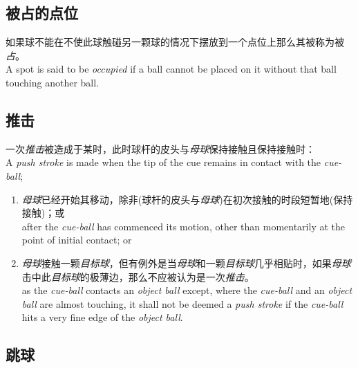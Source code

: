 \subsection{被占的点位}

\noindent 如果球不能在不使此球触碰另一颗球的情况下摆放到一个点位上那么其被称为被\emph{占}。\\
A spot is said to be \emph{occupied} if a ball cannot be placed on it without that ball touching another ball.

\subsection{推击}

\noindent 一次\emph{推击}被造成于某时，此时球杆的皮头与\emph{母球}保持接触且保持接触时：\\
A \emph{push stroke} is made when the tip of the cue remains in contact with the \emph{cue-ball};
\begin{enumerate}[label=(\alph*)]
    \item \emph{母球}已经开始其移动，除非(球杆的皮头与\emph{母球})在初次接触的时段短暂地(保持接触)；或\\
    after the \emph{cue-ball} has commenced its motion, other than momentarily at the point of initial contact; or
    \item \emph{母球}接触一颗\emph{目标球}，但有例外是当\emph{母球}和一颗\emph{目标球}几乎相贴时，如果\emph{母球}击中此\emph{目标球}的极薄边，那么不应被认为是一次\emph{推击}。\\
    as the \emph{cue-ball} contacts an \emph{object ball} except, where the \emph{cue-ball} and an \emph{object ball} are almost touching, it shall not be deemed a \emph{push stroke} if the \emph{cue-ball} hits a very fine edge of the \emph{object ball}.
\end{enumerate}

\subsection{跳球}

